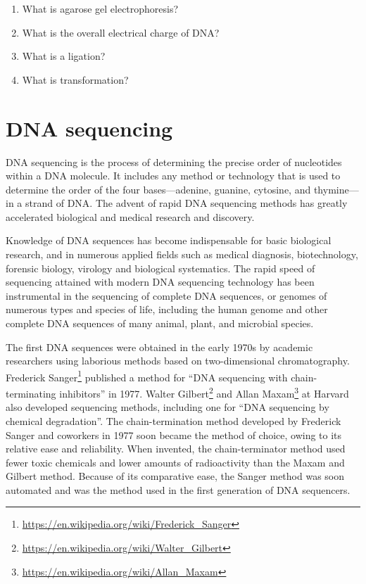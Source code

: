 \documentclass[]{book}
\providecommand{\tightlist}{%
  \setlength{\itemsep}{0pt}\setlength{\parskip}{0pt}}
\let\rmarkdownfootnote\footnote%
\def\footnote{\protect\rmarkdownfootnote}
\renewcommand{\href}[2]{#2\footnote{\url{#1}}}
\theoremstyle{definition}
\theoremstyle{definition}
\theoremstyle{definition}
\theoremstyle{remark}
\begin{document}
\begin{enumerate}
\def\labelenumi{\arabic{enumi}.}
\tightlist
\item
  What is agarose gel electrophoresis?
\item
  What is the overall electrical charge of DNA?
\item
  What is a ligation?
\item
  What is transformation?
\end{enumerate}

\chapter{DNA sequencing}\label{dna-sequencing}

DNA sequencing is the process of determining the precise order of
nucleotides within a DNA molecule. It includes any method or technology
that is used to determine the order of the four bases---adenine,
guanine, cytosine, and thymine---in a strand of DNA. The advent of rapid
DNA sequencing methods has greatly accelerated biological and medical
research and discovery.

Knowledge of DNA sequences has become indispensable for basic biological
research, and in numerous applied fields such as medical diagnosis,
biotechnology, forensic biology, virology and biological systematics.
The rapid speed of sequencing attained with modern DNA sequencing
technology has been instrumental in the sequencing of complete DNA
sequences, or genomes of numerous types and species of life, including
the human genome and other complete DNA sequences of many animal, plant,
and microbial species.

The first DNA sequences were obtained in the early 1970s by academic
researchers using laborious methods based on two-dimensional
chromatography.
\href{https://en.wikipedia.org/wiki/Frederick_Sanger}{Frederick Sanger}
published a method for ``DNA sequencing with chain-terminating
inhibitors'' in 1977.
\href{https://en.wikipedia.org/wiki/Walter_Gilbert}{Walter Gilbert} and
\href{https://en.wikipedia.org/wiki/Allan_Maxam}{Allan Maxam} at Harvard
also developed sequencing methods, including one for ``DNA sequencing by
chemical degradation''. The chain-termination method developed by
Frederick Sanger and coworkers in 1977 soon became the method of choice,
owing to its relative ease and reliability. When invented, the
chain-terminator method used fewer toxic chemicals and lower amounts of
radioactivity than the Maxam and Gilbert method. Because of its
comparative ease, the Sanger method was soon automated and was the
method used in the first generation of DNA sequencers.
\end{document}
